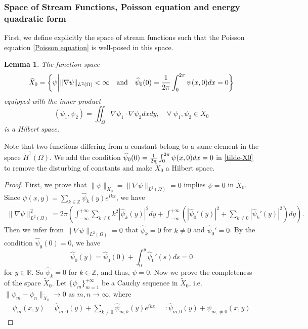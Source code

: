 \documentclass[1 [leqno, 11pt]{amsart}
\numberwithin{equation}{section}
\newtheorem{lemma}[Theorem]{Lemma}
\begin{document}
\begin{CJK*}{GBK}{song}
\subsubsection{Space of Stream Functions, Poisson equation and energy quadratic form}
First, we define explicitly   the space of stream functions such that the Poisson equation \eqref{Poisson equation} is well-posed in this space.
\begin{lemma}\label{Hilbert}
The function space
\begin{align}\label{tilde-X0}
\tilde{X}_0 = \left\{ \psi \bigg| \|\nabla \psi\|_{L^2(\Omega)} < \infty\quad {\rm{ and }}\quad\widehat\psi_0(0)={1\over2\pi} \int_{0}^{2\pi} \psi(x, 0)d x= 0 \right\}
\end{align} equipped with the inner product $$(\psi_1, \psi_2) = \iint_\Omega \nabla \psi_1 \cdot \nabla \psi_2 dxdy, \quad \forall\; \psi_1, \psi_2 \in \tilde{X}_0$$ is a Hilbert space.
\end{lemma}
Note that two functions differing from a constant belong to a same element in the space $\dot{H}^1(\Omega)$. We add the condition $\widehat \psi_0(0)={1\over 2\pi}\int_{0}^{2\pi} \psi(x, 0)d x= 0$ in \eqref{tilde-X0} to remove the disturbing of constants and make $\tilde{X}_0 $ a Hilbert space.
\begin{proof}
First, we prove that $\|\psi\|_{\tilde{X}_0}= \|\nabla \psi\|_{L^2(\Omega)} = 0$ implies $\psi = 0$ in $\tilde{X}_0$. Since $\psi(x,y)=\sum_{k\in\mathbb{Z}}\widehat{\psi}_{k}(y)e^{ik x}$,  we have
\begin{align}\label{tilde-X0-norm}
\|\nabla \psi\|_{L^2(\Omega)}^2
=  2\pi \left( \int_{-\infty}^{+\infty} \sum_{k\neq0} k^2 \left|\widehat{\psi}_k(y)\right|^2 dy + \int_{-\infty}^{+\infty}\left( \left| \widehat{\psi}_0'(y)\right|^2  +  \sum_{k\neq 0}\left| \widehat{\psi}_k'(y)\right|^2\right) dy \right).
\end{align}
Then we infer from $\|\nabla \psi\|_{L^2(\Omega)} = 0$ that
$ \widehat{\psi}_k= 0$ for $k\neq 0$   and $\widehat{\psi}_0' =0$.
By the condition $\widehat{\psi}_0(0)= 0$, we have
$$\widehat{\psi}_0(y) = \widehat{\psi}_0(0) + \int_0^{y}\widehat{\psi}_0'(s) ds = 0$$
for $y \in \mathbb{R}$.
So $\widehat{\psi}_k = 0$ for  $k\in\mathbb{Z}$, and thus, $\psi= 0$.
Now we prove the completeness of the space $\tilde{X}_0$.
Let $\{\psi_m \}_{m=1}^{+\infty}$ be a Cauchy sequence in $\tilde{X}_0$, i.e.
$\|\psi_m - \psi_n\|_{\tilde{X}_0} \to 0$ as $m,n \rightarrow \infty$,
where
\begin{align}\label{psi-m-dec}
\psi_m(x,y) = \widehat{\psi}_{m,0}(y) + \sum_{k\neq0}\widehat{\psi}_{m,k}(y)e^{ikx} =: \widehat{\psi}_{m,0}(y) + {\psi}_{m,\neq 0}(x,y)

\end{align}
\end{proof}
\end{CJK*}
\end{document}
